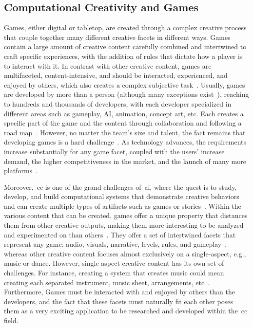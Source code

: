 \subsection{Computational Creativity and Games}

Games, either digital or tabletop, are created through a complex creative process that couple together many different creative facets in different ways. Games contain a large amount of creative content carefully combined and intertwined to craft specific experiences, with the addition of rules that dictate how a player is to interact with it. In contrast with other creative content, games are multifaceted, content-intensive, and should be interacted, experienced, and enjoyed by others, which also creates a complex subjective task~\cite{Liapis2014-gameCreativity}. Usually, games are developed by more than a person (although many exceptions exist~\cite{minecraft,undertale,stardewvalley}), reaching to hundreds and thousands of developers, with each developer specialized in different areas such as gameplay, AI, animation, concept art, etc. Each creates a specific part of the game and the content through collaboration and following a road map~\cite[Chapter~14]{fullerton2004-gamedesign}. However, no matter the team's size and talent, the fact remains that developing games is a hard challenge~\cite{Blow2004-gamesHard}. As technology advances, the requirements increase substantially for any game facet, coupled with the users' increase demand, the higher competitiveness in the market, and the launch of many more platforms~\cite{Washburn2016-gamesPostmorten}.

Moreover,~\acrfull{cc} is one of the grand challenges of~\acrshort{ai}, where the quest is to study, develop, and build computational systems that demonstrate creative behaviors and can create multiple types of artifacts such as games or stories~\cite{Colton2012-CC}. Within the various content that can be created, games offer a unique property that distances them from other creative outputs, making them more interesting to be analyzed and experimented on than others~\cite{Liapis2014-gameCreativity}. They offer a set of intertwined facets that represent any game: audio, visuals, narrative, levels, rules, and gameplay~\cite{Liapis2019-OrchestratingGames}, whereas other creative content focuses almost exclusively on a single-aspect, e.g., music or dance. However, single-aspect creative content has its own set of challenges. For instance, creating a system that creates music could mean creating each separated instrument, music sheet, arrangements, etc~\cite{HooverPhD}. Furthermore, Games must be interacted with and enjoyed by others than the developers, and the fact that these facets must naturally fit each other poses them as a very exciting application to be researched and developed within the~\acrshort{cc} field.

